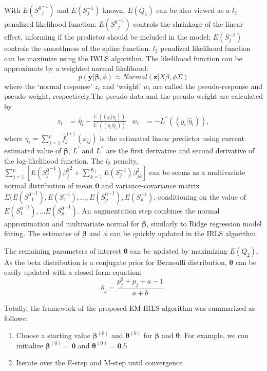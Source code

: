 \documentclass[AMA,STIX1COL,]{WileyNJD-v2}
\begin{document}
With \(E({S^0}^{-1}_{j})\) and \(E(S^{-1}_{j})\) known, \(E(Q_1)\) can
be also viewed as a \(l_2\) penalized likelihood function:
\(E({S^0}^{-1}_{j})\) controls the shrinkage of the linear effect,
informing if the predictor should be included in the model;
\(E(S^{-1}_{j})\) controls the smoothness of the spline function.
\(l_2\) penalized likelihood function can be maximize using the IWLS
algorithm. The likelihood function can be approximate by a weighted
normal likelihood: \[
  p(\textbf{y}|\boldsymbol{\beta}, \phi) \approx Normal(\textbf{z}|X\beta, \phi\Sigma)
\] where the `normal response' \(z_i\) and `weight' \(w_i\) are called
the pseudo-response and pseudo-weight, respectively.The pseudo data and
the pseudo-weight are calculated by \[
    \begin{aligned}
    z_i &= \hat\eta_i - \frac{L^{'}((y_i|\hat\eta_i))}{L^{''}((y_i|\hat\eta_i))}& w_i &= - L^{''}((y_i|\hat\eta_i)),
    \end{aligned}
    \] where \(\eta_i = \sum\limits_{j=1}^p \hat f_j^{(t)}(x_{ij})\) is
the estimated linear predictor using current estimated value of
\(\boldsymbol{\beta}\), \(L^{'}\) and \(L^{''}\) are the first
derivative and second derivative of the log-likelihood function. The
\(l_2\) penalty,
\(\sum\limits_{j=1}^{p}\left[E({S^0_j}^{-1}){\beta^0_j}^2+\sum\limits_{k=1}^{K_j}E(S^{-1}_{j})\beta_{jk}^2\right]\)
can be seems as a multivariate normal distribution of mean
\(\textbf{0}\) and variance-covariance matrix
\(\Sigma(E({S^0}_1^{-1}), E(S_1^{-1}), \dots, E({S_p^0}^{-1}), E(S_p^{-1})\),
conditioning on the value of \(E({S^0_1}^{-1}), \dots E({S^0_p}^{-1})\).
An augmentation step combines the normal approximation and multivariate
normal for \(\boldsymbol{\beta}\), similarly to Ridge regression model
fitting. The estimates of \(\boldsymbol{\beta}\) and \(\phi\) can be
quickly updated in the IRLS algorithm.

The remaining parameters of interest \(\boldsymbol{\theta}\) can be
updated by maximizing \(E(Q_2)\). As the beta distribution is a
conjugate prior for Bernoulli distribution, \(\boldsymbol{\theta}\) can
be easily updated with a closed form equation: \[
\theta_j = \frac{p^0_j + p_{j} + a - 1 }{a + b}.
\]

Totally, the framework of the proposed EM IRLS algorithm was summarized
as follows:

\begin{enumerate}
\def\labelenumi{\arabic{enumi})}
\item
  Choose a starting value \(\boldsymbol{\beta}^{(0)}\) and
  \(\boldsymbol{\theta}^{(0)}\) for \(\boldsymbol{\beta}\) and
  \(\boldsymbol{\theta}\). For example, we can initialize
  \(\boldsymbol{\beta}^{(0)} = \boldsymbol{0}\) and
  \(\boldsymbol{\theta}^{(0)} = \boldsymbol{0}.5\)
\item
  Iterate over the E-step and M-step until convergence
\end{enumerate}
\end{document}
